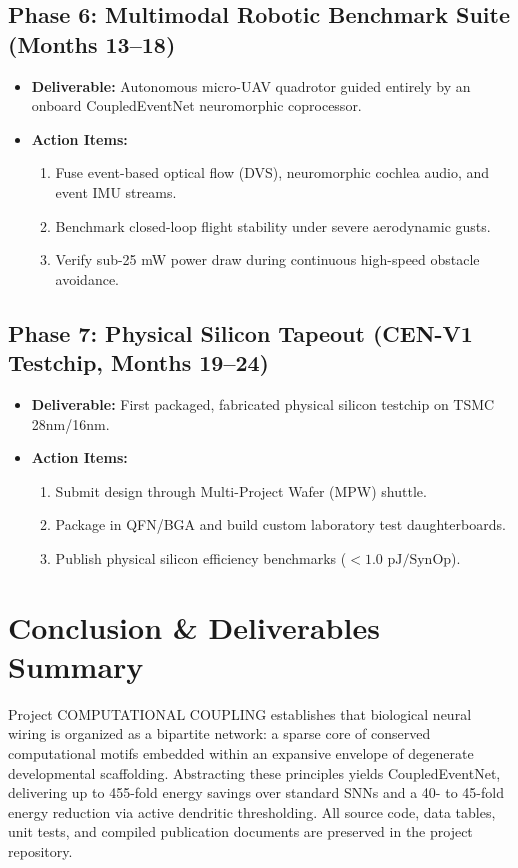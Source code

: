 \documentclass[11pt,letterpaper]{report}
\begin{document}
\section{Phase 6: Multimodal Robotic Benchmark Suite (Months 13--18)}
\begin{itemize}[leftmargin=*]
    \item \textbf{Deliverable:} Autonomous micro-UAV quadrotor guided entirely by an onboard CoupledEventNet neuromorphic coprocessor.
    \item \textbf{Action Items:}
        \begin{enumerate}
            \item Fuse event-based optical flow (DVS), neuromorphic cochlea audio, and event IMU streams.
            \item Benchmark closed-loop flight stability under severe aerodynamic gusts.
            \item Verify sub-25 mW power draw during continuous high-speed obstacle avoidance.
        \end{enumerate}
\end{itemize}

\section{Phase 7: Physical Silicon Tapeout (CEN-V1 Testchip, Months 19--24)}
\begin{itemize}[leftmargin=*]
    \item \textbf{Deliverable:} First packaged, fabricated physical silicon testchip on TSMC 28nm/16nm.
    \item \textbf{Action Items:}
        \begin{enumerate}
            \item Submit design through Multi-Project Wafer (MPW) shuttle.
            \item Package in QFN/BGA and build custom laboratory test daughterboards.
            \item Publish physical silicon efficiency benchmarks ($<1.0\text{ pJ/SynOp}$).
        \end{enumerate}
\end{itemize}

\chapter{Conclusion \& Deliverables Summary}
Project COMPUTATIONAL COUPLING establishes that biological neural wiring is organized as a bipartite network: a sparse core of conserved computational motifs embedded within an expansive envelope of degenerate developmental scaffolding. Abstracting these principles yields CoupledEventNet, delivering up to 455-fold energy savings over standard SNNs and a 40- to 45-fold energy reduction via active dendritic thresholding. All source code, data tables, unit tests, and compiled publication documents are preserved in the project repository.
\end{document}
